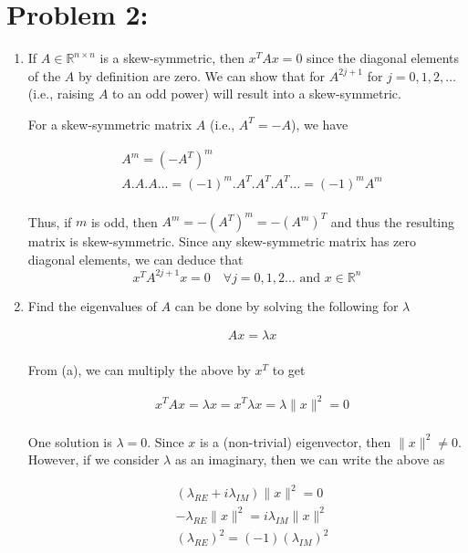 \newpage
\section*{Problem 2:}
\begin{enumerate}
\item If $A \in \mathbb{R}^{n\times n}$ is a skew-symmetric, then $x^{T}Ax =0$ since the diagonal elements of the $A$ by definition are zero. We can show that for $A^{2j+1}$ for $j=0,1,2, \dots$ (i.e., raising $A$ to an odd power) will result into a skew-symmetric. 

For a skew-symmetric matrix $A$ (i.e., $A^{T} = -A$), we have 

\begin{align*}
& A^{m} = (-A^{T})^{m}  \\
& A.A.A\dots=(-1)^{m}.A^{T}.A^{T}.A^{T}\dots =(-1)^{m}A^{m} \\
\end{align*}


Thus, if $m$ is odd, then $A^{m} = -(A^{T})^{m} = -(A^{m})^{T}$ and thus the resulting matrix is skew-symmetric. Since any skew-symmetric matrix has zero diagonal elements, we can deduce that 
$$
x^{T}A^{2j+1}x = 0\quad \forall j=0,1,2\dots \text{ and } x\in \mathbb{R}^{n}
$$

\item Find the eigenvalues of $A$ can be done by solving the following for $\lambda$

\begin{align*}
&Ax = \lambda x\\
\end{align*}

From (a), we can multiply the above by $x^{T}$ to get 

\begin{align*}
& x^{T}Ax = \lambda x = x^{T}\lambda x = \lambda \parallel x \parallel^{2} = 0\\
\end{align*}

One solution is $\lambda = 0$. Since $x$ is a (non-trivial) eigenvector, then $\parallel x \parallel^{2} \neq 0$. However, if we consider $\lambda$ as an imaginary, then we can write the above as

\begin{align*}
& (\lambda_{RE} + i \lambda_{IM})  \parallel x \parallel^{2} = 0\\
& -\lambda_{RE}\parallel x \parallel^{2} = i \lambda_{IM}\parallel x \parallel^{2}\\ 
& \left(\lambda_{RE}\right)^{2} = (-1) \left(\lambda_{IM}\right)^{2}\\ 
\end{align*}


\end{enumerate}
